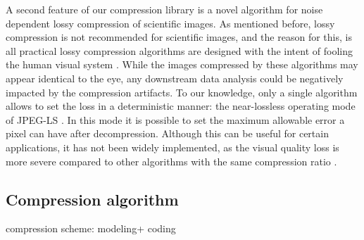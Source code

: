   A second feature of our compression library is a novel algorithm for noise dependent lossy compression of scientific images. As mentioned before, lossy compression is not recommended for scientific images, and the reason for this, is all practical lossy compression algorithms are designed with the intent of fooling the human visual system \cite{sayood_introduction_2012}. While the images compressed by these algorithms may appear identical to the eye, any downstream data analysis could be negatively impacted by the compression artifacts. To our knowledge, only a single algorithm allows to set the loss in a deterministic manner: the near-lossless operating mode of JPEG-LS \cite{weinberger_loco-i_2000}. In this mode it is possible to set the maximum allowable error a pixel can have after decompression. Although this can be useful for certain applications, it has not been widely implemented, as the visual quality loss is more severe compared to other algorithms with the same compression ratio \cite{santa-cruz_study_2000}.









    


    

  \subsection{Compression algorithm}

    compression scheme: modeling+ coding \cite{rissanen_universal_1981}

    
